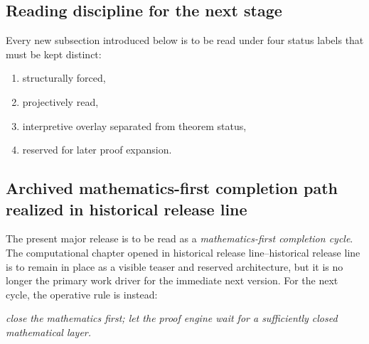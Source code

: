 \documentclass[12pt,a4paper]{article}
\DeclareRobustCommand{\QSCver}[1]{archival stage}
\renewcommand{\QSCver}[1]{historical release line}
\begin{document}
\subsection*{Reading discipline for the next stage}
Every new subsection introduced below is to be read under four status labels that must be kept distinct:
\begin{enumerate}[leftmargin=2em,label=(\alph*)]
 \item structurally forced,
 \item projectively read,
 \item interpretive overlay separated from theorem status,
 \item reserved for later proof expansion.
\end{enumerate}


\subsection*{Archived mathematics-first completion path realized in \QSCver{v2.27.0}}

The present major release is to be read as a \emph{mathematics-first completion cycle}. The computational chapter opened in \QSCver{v2.24.0}--\QSCver{v2.26.0} is to remain in place as a visible teaser and reserved architecture, but it is no longer the primary work driver for the immediate next version. For the next cycle, the operative rule is instead:
\begin{center}
\emph{close the mathematics first; let the proof engine wait for a sufficiently closed mathematical layer.}
\end{center}
\end{document}
